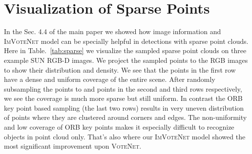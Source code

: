 \documentclass[10pt,twocolumn,letterpaper]{article}
\newcommand{\votenet}{\textsc{VoteNet}\xspace}
\newcommand{\imvotenet}{\textsc{ImVoteNet}\xspace}
\newcommand{\ours}{\imvotenet}
\begin{document}
\section{Visualization of Sparse Points}
\label{supp:sec:visu}
In the Sec. 4.4 of the main paper we showed how image information and \ours model can be specially helpful in detections with sparse point clouds. Here in Table.~\ref{tab:sparse} we visualize the sampled sparse point clouds on three example SUN RGB-D images. We project the sampled points to the RGB images to show their distribution and density. We see that the  points in the first row have a dense and uniform coverage of the entire scene. After randomly subsampling the points to  and  points in the second and third rows respectively, we see the coverage is much more sparse but still uniform. In contrast the ORB key point based sampling (the last two rows) results in very uneven distribution of points where they are clustered around corners and edges. The non-uniformity and low coverage of ORB key points makes it especially difficult to recognize objects in point cloud only. That's also where our \ours model showed the most significant improvement upon \votenet.



 
\end{document}
